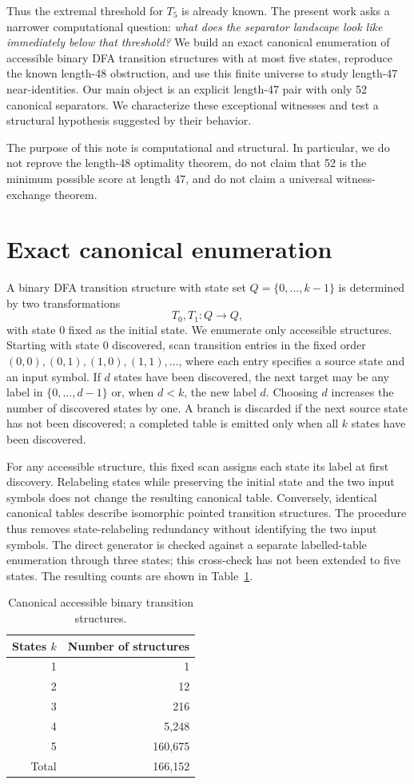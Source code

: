 \documentclass[10pt]{article}
\begin{document}
Thus the extremal threshold for $T_5$ is already known.  The present work asks a narrower computational question: \emph{what does the separator landscape look like immediately below that threshold?}  We build an exact canonical enumeration of accessible binary DFA transition structures with at most five states, reproduce the known length-48 obstruction, and use this finite universe to study length-47 near-identities.  Our main object is an explicit length-47 pair with only 52 canonical separators.  We characterize these exceptional witnesses and test a structural hypothesis suggested by their behavior.

The purpose of this note is computational and structural.  In particular, we do not reprove the length-48 optimality theorem, do not claim that 52 is the minimum possible score at length 47, and do not claim a universal witness-exchange theorem.

\section{Exact canonical enumeration}
A binary DFA transition structure with state set $Q=\{0,\ldots,k-1\}$ is determined by two transformations
\[
T_0,T_1:Q\to Q,
\]
with state $0$ fixed as the initial state.  We enumerate only accessible structures.  Starting with state $0$ discovered, scan transition entries in the fixed order $(0,0),(0,1),(1,0),(1,1),\ldots$, where each entry specifies a source state and an input symbol.  If $d$ states have been discovered, the next target may be any label in $\{0,\ldots,d-1\}$ or, when $d<k$, the new label $d$.  Choosing $d$ increases the number of discovered states by one.  A branch is discarded if the next source state has not been discovered; a completed table is emitted only when all $k$ states have been discovered.

For any accessible structure, this fixed scan assigns each state its label at first discovery.  Relabeling states while preserving the initial state and the two input symbols does not change the resulting canonical table.  Conversely, identical canonical tables describe isomorphic pointed transition structures.  The procedure thus removes state-relabeling redundancy without identifying the two input symbols.  The direct generator is checked against a separate labelled-table enumeration through three states; this cross-check has not been extended to five states.  The resulting counts are shown in Table~\ref{tab:counts}.

\begin{table}[h]
\centering
\caption{Canonical accessible binary transition structures.}
\label{tab:counts}
\begin{tabular}{rr}
\toprule
States $k$ & Number of structures \\
\midrule
1 & 1 \\
2 & 12 \\
3 & 216 \\
4 & 5,248 \\
5 & 160,675 \\
\midrule
Total & 166,152 \\
\bottomrule
\end{tabular}
\end{table}
\end{document}
